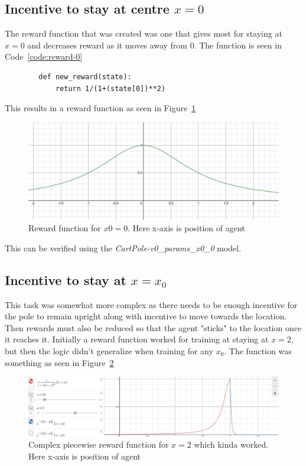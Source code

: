 \documentclass[a4paper]{article}
\newenvironment{code}{\captionsetup{type=listing}}{}
\begin{document}
\subsection{Incentive to stay at centre $x=0$}
    The reward function that was created was one that gives most for staying at $x=0$ and decreases reward as it moves away from 0. The function is seen in Code~\ref{code:reward-0}
    \begin{code}
        \label{code:reward-0}
    \begin{verbatim}
        def new_reward(state):
            return 1/(1+(state[0])**2) 
    \end{verbatim}
    \end{code}
    This results in a reward function as seen in Figure~\ref{fig:reward-0}
    \begin{figure}[ht!]
        \centering
        \includegraphics[width=\textwidth]{center.PNG}
        \caption{Reward function for $x0=0$. Here x-axis is position of agent}
        \label{fig:reward-0}
    \end{figure}
    This can be verified using the \textit{CartPole-v0\_params\_x0\_0} model.
\subsection{Incentive to stay at $x=x_0$}
    This task was somewhat more complex as there needs to be enough incentive for the pole to remain upright along with incentive to move towards the location. Then rewards must also be reduced so that the agent "sticks" to the location once it reaches it.
    Initially a reward function worked for training at staying at $x=2$, but then the logic didn't generalize when training for any $x_0$. The function was something as seen in Figure~\ref{fig:kinda}
    \begin{figure}[ht!]
        \centering
        \includegraphics[width=\textwidth]{other_reward.PNG}
        \caption{Complex piecewise reward function for $x=2$ which kinda worked. Here x-axis is position of agent }
        \label{fig:kinda}
    \end{figure}  
\end{document}
